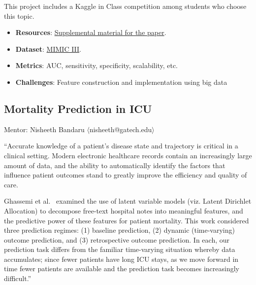 \documentclass[journal]{IEEEtran}
\begin{document}
This project includes a Kaggle in Class competition among students who choose this topic.

\begin{itemize}
	\item \textbf{Resources}:  \href{http://stm.sciencemag.org.prx.library.gatech.edu/highwire/filestream/197913/field_highwire_adjunct_files/0/7-299ra122_SM.pdf}{Supplemental material for the paper}.
   	\item \textbf{Dataset}: \href{https://mimic.physionet.org/gettingstarted/dbsetup/}{MIMIC III}.
    \item \textbf{Metrics}: AUC, sensitivity, specificity, scalability, etc.
    \item \textbf{Challenges}: Feature construction and implementation using big data
\end{itemize}


\subsection{Mortality Prediction in ICU}
Mentor: Nisheeth Bandaru $\langle$nisheeth@gatech.edu$\rangle$

``Accurate knowledge of a patient’s disease state and trajectory
is critical in a clinical setting. Modern electronic healthcare
records contain an increasingly large amount of data,
and the ability to automatically identify the factors that
influence patient outcomes stand to greatly improve the efficiency and quality of care.

Ghassemi et al.~\cite{ghassemi_unfolding_2014} examined the use of latent variable models (viz. Latent Dirichlet Allocation) to decompose free-text hospital
notes into meaningful features, and the predictive power of
these features for patient mortality. This work considered three
prediction regimes: (1) baseline prediction, (2) dynamic (time-varying)
outcome prediction, and (3) retrospective outcome
prediction. In each, our prediction task differs from the
familiar time-varying situation whereby data accumulates;
since fewer patients have long ICU stays, as we move forward
in time fewer patients are available and the prediction
task becomes increasingly difficult.''
\end{document}
